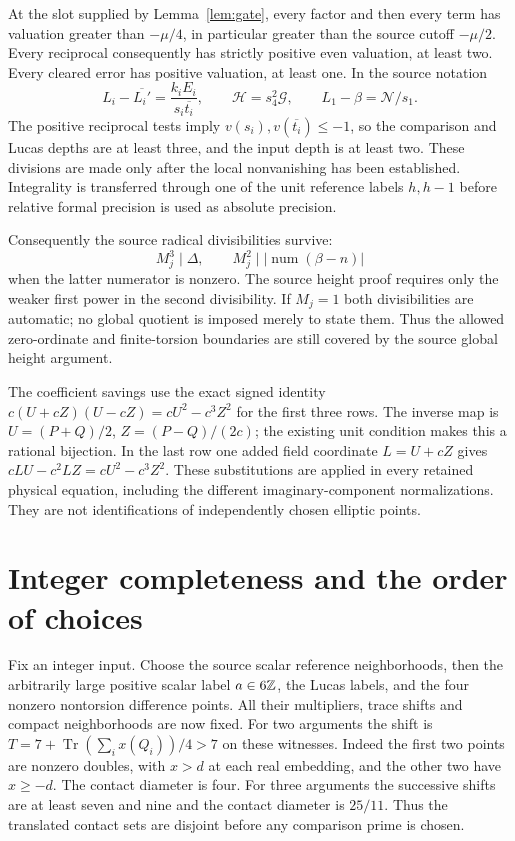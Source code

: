 \documentclass[11pt]{article}
\theoremstyle{remark}\newtheorem{remark}[theorem]{Remark}
\newcommand{\Tr}{\operatorname{Tr}}\newcommand{\Nm}{\operatorname{Nm}}
\begin{document}
At the slot supplied by Lemma~\ref{lem:gate}, every factor and then
every term has valuation greater than $-\mu/4$, in particular greater
than the source cutoff $-\mu/2$. Every reciprocal consequently has
strictly positive even valuation, at least two. Every cleared error
has positive valuation, at least one. In the source notation
\[
 L_i-\overline{L_i'}=\frac{k_iE_i}{s_i\overline{t_i}},
 \qquad \mathcal H=s_4^2\mathcal G,
 \qquad L_1-\beta=\mathcal N/s_1.
\]
The positive reciprocal tests imply $v(s_i),v(\overline{t_i})\le-1$,
so the comparison and Lucas depths are at least three, and the input
depth is at least two. These divisions are made only after the local
nonvanishing has been established. Integrality is transferred through
one of the unit reference labels $h,h-1$ before relative formal
precision is used as absolute precision.

Consequently the source radical divisibilities survive:
\[
 M_j^3\mid\Delta,\qquad M_j^2\mid
 |\operatorname{num}(\beta-n)|
\]
when the latter numerator is nonzero. The source height proof requires
only the weaker first power in the second divisibility. If $M_j=1$
both divisibilities are automatic; no global quotient is imposed merely
to state them. Thus the allowed zero-ordinate and finite-torsion
boundaries are still covered by the source global height argument.

The coefficient savings use the exact signed identity
$c(U+cZ)(U-cZ)=cU^2-c^3Z^2$ for the first three rows.
The inverse map is $U=(P+Q)/2$, $Z=(P-Q)/(2c)$; the existing unit
condition makes this a rational bijection. In the last row one added
field coordinate $L=U+cZ$ gives
$cLU-c^2LZ=cU^2-c^3Z^2$.
These substitutions are applied in every retained physical equation,
including the different imaginary-component normalizations. They are
not identifications of independently chosen elliptic points.

\section{Integer completeness and the order of choices}
Fix an integer input. Choose the source scalar reference neighborhoods,
then the arbitrarily large positive scalar label $a\in6\mathbb Z$, the Lucas
labels, and the four nonzero nontorsion difference points. All their
multipliers, trace shifts and compact neighborhoods are now fixed.
For two arguments the shift is
$T=7+\Tr(\sum_i x(Q_i))/4>7$ on these witnesses. Indeed the first
two points are nonzero doubles, with $x>d$ at each real embedding,
and the other two have $x\ge-d$. The contact diameter is four.
For three arguments the successive shifts are at least seven and
nine and the contact diameter is $25/11$. Thus the translated contact
sets are disjoint before any comparison prime is chosen.
\end{document}
